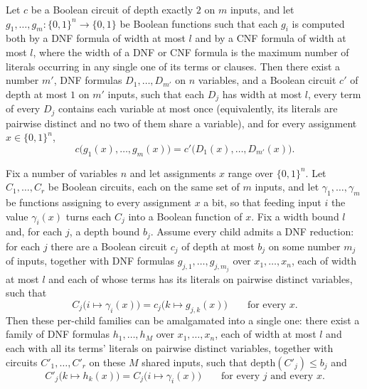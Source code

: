 \begin{lemma}
\label{LMN.exists_circuit_depth_reduction_depth2}
\leanok
{}
Let $c$ be a Boolean circuit of depth exactly $2$ on $m$ inputs, and let $g_1,\dots,g_m
\colon \{0,1\}^n \to \{0,1\}$ be Boolean functions such that each $g_i$ is computed both
by a DNF formula of width at most $l$ and by a CNF formula of width at most $l$, where
the width of a DNF or CNF formula is the maximum number of literals occurring in any
single one of its terms or clauses. Then there exist a number $m'$, DNF formulas
$D_1,\dots,D_{m'}$ on $n$ variables, and a Boolean circuit $c'$ of depth at most $1$ on
$m'$ inputs, such that each $D_j$ has width at most $l$, every term of every $D_j$
contains each variable at most once (equivalently, its literals are pairwise distinct
and no two of them share a variable), and for every assignment $x \in \{0,1\}^n$,
\[ c\bigl(g_1(x),\dots,g_m(x)\bigr) = c'\bigl(D_1(x),\dots,D_{m'}(x)\bigr). \]
\end{lemma}

\begin{lemma}
\label{LMN.reduce_children}
\leanok
{}
Fix a number of variables $n$ and let assignments $x$ range over $\{0,1\}^n$. Let
$C_1,\dots,C_r$ be Boolean circuits, each on the same set of $m$ inputs, and let
$\gamma_1,\dots,\gamma_m$ be functions assigning to every assignment $x$ a bit, so that
feeding input $i$ the value $\gamma_i(x)$ turns each $C_j$ into a Boolean function of
$x$. Fix a width bound $l$ and, for each $j$, a depth bound $b_j$. Assume every child
admits a DNF reduction: for each $j$ there are a Boolean circuit $c_j$ of depth at most
$b_j$ on some number $m_j$ of inputs, together with DNF formulas
$g_{j,1},\dots,g_{j,m_j}$ over $x_1,\dots,x_n$, each of width at most $l$ and each of
whose terms has its literals on pairwise distinct variables, such that
\[ C_j\big(i \mapsto \gamma_i(x)\big) = c_j\big(k \mapsto g_{j,k}(x)\big) \qquad \text{for every } x. \]
Then these per-child families can be amalgamated into a single one: there exist a family
of DNF formulas $h_1,\dots,h_M$ over $x_1,\dots,x_n$, each of width at most $l$ and each
with all its terms' literals on pairwise distinct variables, together with circuits
$C'_1,\dots,C'_r$ on these $M$ shared inputs, such that $\mathrm{depth}(C'_j) \le b_j$
and
\[ C'_j\big(k \mapsto h_k(x)\big) = C_j\big(i \mapsto \gamma_i(x)\big) \qquad \text{for every } j \text{ and every } x. \]
\end{lemma}

